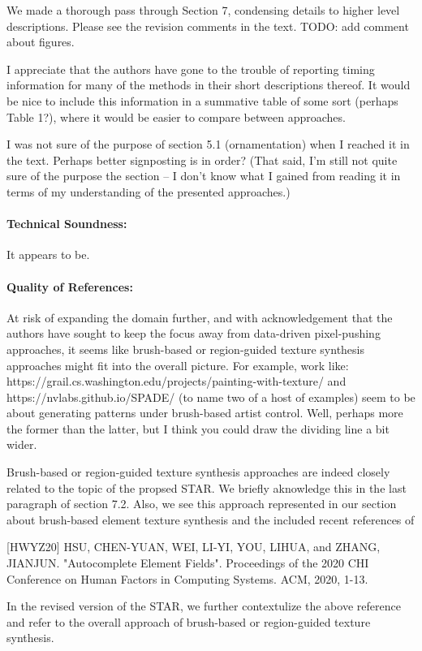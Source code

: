 \documentclass{egpubl}
\newcommand{\rev}[2]{{\color{greenrev}\textsuperscript{#1}#2}}
\renewcommand{\rev}[2]{{#2}}
\begin{document}
\rev{}{We made a thorough pass through Section 7, condensing details to higher level descriptions. Please see the revision comments in the text. TODO: add comment about figures.}

I appreciate that the authors have gone to the trouble of reporting timing information for many of the methods in their short descriptions thereof. It would be nice to include this information in a summative table of some sort (perhaps Table 1?), where it would be easier to compare between approaches.

I was not sure of the purpose of section 5.1 (ornamentation) when I reached it in the text. Perhaps better signposting is in order? (That said, I'm still not quite sure of the purpose the section -- I don't know what I gained from reading it in terms of my understanding of the presented approaches.)
\paragraph*{Technical Soundness:} It appears to be.
\paragraph*{Quality of References:} At risk of expanding the domain further, and with acknowledgement that the authors have sought to keep the focus away from data-driven pixel-pushing approaches,  it seems like brush-based or region-guided texture synthesis approaches might fit into the overall picture. For example, work like:
https://grail.cs.washington.edu/projects/painting-with-texture/
and https://nvlabs.github.io/SPADE/
(to name two of a host of examples)
seem to be about generating patterns under brush-based artist control. Well, perhaps more the former than the latter, but I think you could draw the dividing line a bit wider.

\rev{Comment}{
    Brush-based or region-guided texture synthesis approaches are indeed closely related to the topic of the propsed STAR. We briefly aknowledge this in the last paragraph of section 7.2. 
    Also, we see this approach represented in our section about brush-based element texture synthesis and the included recent references of 

    [HWYZ20]  HSU, CHEN-YUAN, WEI, LI-YI, YOU, LIHUA, and ZHANG, JIANJUN. "Autocomplete Element Fields". Proceedings of the 2020 CHI Conference on Human Factors in Computing Systems. ACM, 2020, 1-13.

    In the revised version of the STAR, we further contextulize the above reference and refer to the overall approach of brush-based or region-guided texture synthesis.
}
\end{document}
